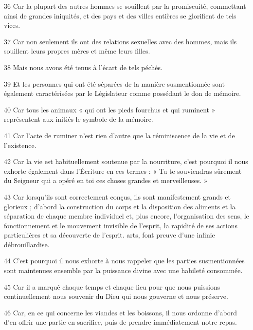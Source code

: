 \par 36 Car la plupart des autres hommes se souillent par la promiscuité, commettant ainsi de grandes iniquités, et des pays et des villes entières se glorifient de tels vices.

\par 37 Car non seulement ils ont des relations sexuelles avec des hommes, mais ils souillent leurs propres mères et même leurs filles.

\par 38 Mais nous avons été tenus à l'écart de tels péchés.

\par 39 Et les personnes qui ont été séparées de la manière susmentionnée sont également caractérisées par le Législateur comme possédant le don de mémoire.

\par 40 Car tous les animaux « qui ont les pieds fourchus et qui ruminent » représentent aux initiés le symbole de la mémoire.

\par 41 Car l'acte de ruminer n'est rien d'autre que la réminiscence de la vie et de l'existence.

\par 42 Car la vie est habituellement soutenue par la nourriture, c'est pourquoi il nous exhorte également dans l'Écriture en ces termes : « Tu te souviendras sûrement du Seigneur qui a opéré en toi ces choses grandes et merveilleuses. »

\par 43 Car lorsqu'ils sont correctement conçus, ils sont manifestement grands et glorieux ; d'abord la construction du corps et la disposition des aliments et la séparation de chaque membre individuel et, plus encore, l'organisation des sens, le fonctionnement et le mouvement invisible de l'esprit, la rapidité de ses actions particulières et sa découverte de l'esprit. arts, font preuve d’une infinie débrouillardise.

\par 44 C'est pourquoi il nous exhorte à nous rappeler que les parties susmentionnées sont maintenues ensemble par la puissance divine avec une habileté consommée.

\par 45 Car il a marqué chaque temps et chaque lieu pour que nous puissions continuellement nous souvenir du Dieu qui nous gouverne et nous préserve.

\par 46 Car, en ce qui concerne les viandes et les boissons, il nous ordonne d'abord d'en offrir une partie en sacrifice, puis de prendre immédiatement notre repas.

